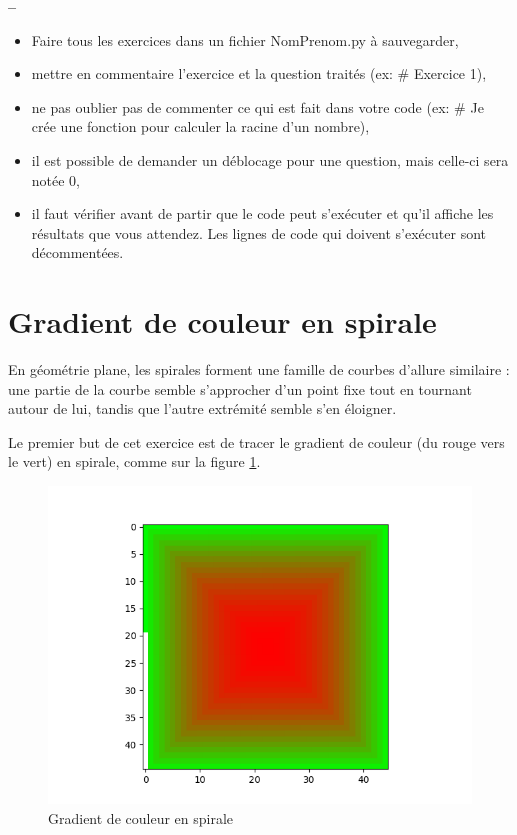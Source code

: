 

\begin{center}
{\Large\bf {\type} \no {\numero} -- \descrip}
\end{center}


\begin{boxedminipage}{.9\textwidth} 
\begin{itemize}
 \item Faire tous les exercices dans un fichier {NomPrenom.py} à sauvegarder,
 \item mettre en commentaire l'exercice et la question traités (ex: \# Exercice 1),
 \item ne pas oublier pas de commenter ce qui est fait dans votre code (ex: \# Je crée une fonction pour calculer la racine d'un nombre),
 \item il est possible de demander un déblocage pour une question, mais celle-ci sera notée 0,
 \item il faut vérifier avant de partir que le code peut s'exécuter et qu'il affiche les résultats que vous attendez. Les lignes de code qui doivent s'exécuter sont décommentées.
\end{itemize}
\end{boxedminipage}

\section{Gradient de couleur en spirale}

En géométrie plane, les spirales forment une famille de courbes d'allure similaire : une partie de la courbe semble s'approcher d'un point fixe tout en tournant autour de lui, tandis que l'autre extrémité semble s'en éloigner. 

	Le premier but de cet exercice est de tracer le gradient de couleur (du rouge vers le vert) en spirale, comme sur la figure \ref{fig01}.

\begin{figure}[!ht]
\centering\includegraphics[width=0.8\linewidth]{img/fig01}
\caption{\label{fig01} Gradient de couleur en spirale }
\end{figure}

